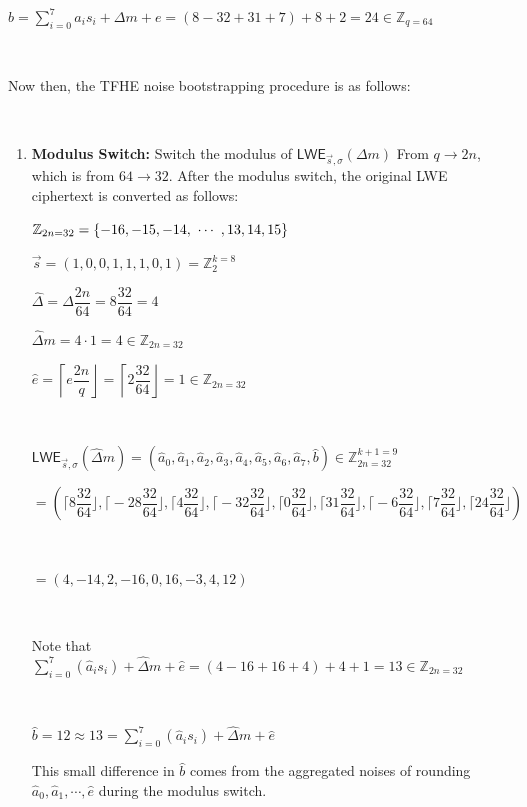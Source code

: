 $b = \sum\limits_{i=0}^{7}a_is_i + \Delta m + e = (8 -32 + 31 +7) + 8 + 2 = 24 \in \mathbb{Z}_{q=64}$

$ $

Now then, the TFHE noise bootstrapping procedure is as follows:

$ $

\begin{enumerate}
\item \textbf{Modulus Switch:} Switch the modulus of $\textsf{LWE}_{\vec{s}, \sigma}(\Delta m)$ From $q \rightarrow 2n$, which is from $64 \rightarrow 32$. After the modulus switch, the original LWE ciphertext is converted as follows:

$\mathbb{Z}_{2n=32} = \{-16, -15, -14, \text{ } \text{$\cdots$} \text{ }, 13, 14, 15\}$

$\vec{s} = (1, 0, 0, 1, 1, 1, 0, 1) = \mathbb{Z}_2^{k=8}$


$\hat{\Delta} = \Delta\dfrac{2n}{64} = 8\dfrac{32}{64} = 4$

$\hat{\Delta}m = 4 \cdot 1 = 4 \in \mathbb{Z}_{2n=32}$

$\hat{e} =  \left\lceil e \dfrac{2n}{q} \right\rfloor = \left\lceil 2\dfrac{32}{64} \right\rfloor = 1 \in \mathbb{Z}_{2n=32}$

$ $

$\textsf{LWE}_{\vec{s}, \sigma}(\hat{\Delta}m) = (\hat{a}_0, \hat{a}_1, \hat{a}_2, \hat{a}_3, \hat{a}_4, \hat{a}_5, \hat{a}_6, \hat{a}_7, \hat{b}) \in \mathbb{Z}_{2n=32}^{k+1=9}$


$ = (\Big\lceil 8\dfrac{32}{64} \Big\rfloor, \Big\lceil -28\dfrac{32}{64}\Big\rfloor, \Big\lceil 4\dfrac{32}{64}\Big\rfloor, \Big\lceil -32\dfrac{32}{64}\Big\rfloor, \Big\lceil 0\dfrac{32}{64}\Big\rfloor, \Big\lceil 31\dfrac{32}{64}\Big\rfloor, \Big\lceil -6\dfrac{32}{64}\Big\rfloor, \Big\lceil 7\dfrac{32}{64}\Big\rfloor, \Big\lceil 24\dfrac{32}{64}\Big\rfloor)$

$ $

$= (4, {-14}, 2, -16, 0, 16, {-3}, 4, 12)$

$ $

Note that $\sum\limits_{i=0}^{7}(\hat{a}_is_i) + \hat{\Delta}m + \hat{e} = (4 - 16 + 16 + 4) + 4 + 1 = 13 \in \mathbb{Z}_{2n=32}$

$ $

$\hat b = 12 \approx 13 = \sum\limits_{i=0}^{7}(\hat{a}_is_i) + \hat{\Delta}m + \hat{e}$

This small difference in $\hat b$ comes from the aggregated noises of rounding $\hat a_0, \hat a_1, \cdots , \hat e$ during the modulus switch. 


\end{enumerate}
